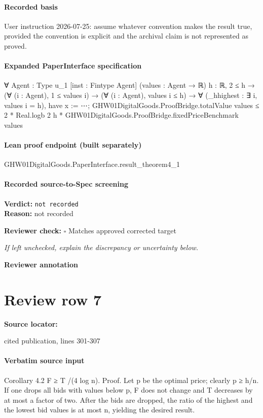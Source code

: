 \documentclass[10pt]{article}
\newcommand{\reviewerbox}{%
  \par\noindent\fbox{\parbox{0.96\linewidth}{\rule{0pt}{0.38in}}}\par
}
\newcommand{\reviewmatch}[1]{%
  \par\noindent\textbf{Reviewer check:} $\square$\; #1\par
  \noindent\emph{If left unchecked, explain the discrepancy or uncertainty below.}\par
}
\begin{document}
\paragraph{Recorded basis}
User instruction 2026-\allowbreak{}07-\allowbreak{}25:\allowbreak{} assume whatever convention makes the result true, provided the convention is explicit and the archival claim is not represented as proved.\allowbreak{}
\paragraph{Expanded PaperInterface specification}
\begin{ReviewVerbatim}
∀ {Agent : Type u_1} [inst : Fintype Agent] (values : Agent → ℝ) {h : ℝ},
  2 ≤ h →
    (∀ (i : Agent), 1 ≤ values i) →
      (∀ (i : Agent), values i ≤ h) →
        ∀ (_hhighest : ∃ i, values i = h),
          have x := ⋯;
          GHW01DigitalGoods.ProofBridge.totalValue values ≤
            2 * Real.logb 2 h * GHW01DigitalGoods.ProofBridge.fixedPriceBenchmark values
\end{ReviewVerbatim}

\paragraph{Lean proof endpoint (built separately)}\begin{ReviewVerbatim}
GHW01DigitalGoods.PaperInterface.result_theorem4_1
\end{ReviewVerbatim}

\paragraph{Recorded source-to-Spec screening}
\textbf{Verdict:} \texttt{not recorded}
\\
\textbf{Reason:} not recorded
\reviewmatch{Matches approved corrected target}
\noindent\textbf{Reviewer annotation}\par
\reviewerbox
\clearpage
\hypertarget{source-claim-c584c5cb21438e15}{}
\section*{Review row 7}
\textbf{Source locator:} {\footnotesize\raggedright cited publication, lines 301-\allowbreak{}307\par}
\paragraph{Verbatim source input}
\begin{ReviewVerbatim}
Corollary 4.2 F ≥ T /(4 log n).
Proof. Let p be the optimal price; clearly p ≥ h/n.
If one drops all bids with values below p, F does not
change and T decreases by at most a factor of two.
After the bids are dropped, the ratio of the highest
and the lowest bid values is at most n, yielding the
desired result.
\end{ReviewVerbatim}
\end{document}
